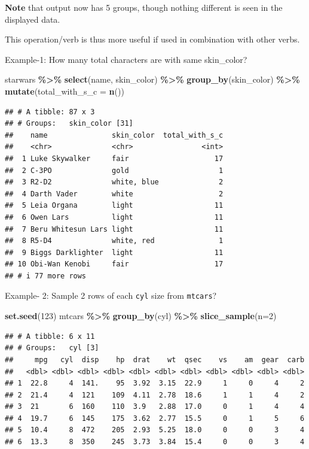 \documentclass[
]{book}
\newenvironment{Shaded}{\begin{snugshade}}{\end{snugshade}}
\newcommand{\AttributeTok}[1]{\textcolor[rgb]{0.13,0.29,0.53}{#1}}
\newcommand{\DecValTok}[1]{\textcolor[rgb]{0.00,0.00,0.81}{#1}}
\newcommand{\FunctionTok}[1]{\textcolor[rgb]{0.13,0.29,0.53}{\textbf{#1}}}
\newcommand{\NormalTok}[1]{#1}
\newcommand{\SpecialCharTok}[1]{\textcolor[rgb]{0.81,0.36,0.00}{\textbf{#1}}}
\begin{document}
\textbf{Note} that output now has 5 groups, though nothing different is seen in the displayed data.

This operation/verb is thus more useful if used in combination with other verbs.

Example-1: How many total characters are with same skin\_color?

\begin{Shaded}
\begin{Highlighting}[]
\NormalTok{starwars }\SpecialCharTok{\%\textgreater{}\%} 
  \FunctionTok{select}\NormalTok{(name, skin\_color) }\SpecialCharTok{\%\textgreater{}\%} 
  \FunctionTok{group\_by}\NormalTok{(skin\_color) }\SpecialCharTok{\%\textgreater{}\%} 
  \FunctionTok{mutate}\NormalTok{(}\AttributeTok{total\_with\_s\_c =} \FunctionTok{n}\NormalTok{())}
\end{Highlighting}
\end{Shaded}

\begin{verbatim}
## # A tibble: 87 x 3
## # Groups:   skin_color [31]
##    name               skin_color  total_with_s_c
##    <chr>              <chr>                <int>
##  1 Luke Skywalker     fair                    17
##  2 C-3PO              gold                     1
##  3 R2-D2              white, blue              2
##  4 Darth Vader        white                    2
##  5 Leia Organa        light                   11
##  6 Owen Lars          light                   11
##  7 Beru Whitesun Lars light                   11
##  8 R5-D4              white, red               1
##  9 Biggs Darklighter  light                   11
## 10 Obi-Wan Kenobi     fair                    17
## # i 77 more rows
\end{verbatim}

Example- 2: Sample 2 rows of each \texttt{cyl} size from \texttt{mtcars}?

\begin{Shaded}
\begin{Highlighting}[]
\FunctionTok{set.seed}\NormalTok{(}\DecValTok{123}\NormalTok{)}
\NormalTok{mtcars }\SpecialCharTok{\%\textgreater{}\%} 
  \FunctionTok{group\_by}\NormalTok{(cyl) }\SpecialCharTok{\%\textgreater{}\%} 
  \FunctionTok{slice\_sample}\NormalTok{(}\AttributeTok{n=}\DecValTok{2}\NormalTok{)}
\end{Highlighting}
\end{Shaded}

\begin{verbatim}
## # A tibble: 6 x 11
## # Groups:   cyl [3]
##     mpg   cyl  disp    hp  drat    wt  qsec    vs    am  gear  carb
##   <dbl> <dbl> <dbl> <dbl> <dbl> <dbl> <dbl> <dbl> <dbl> <dbl> <dbl>
## 1  22.8     4  141.    95  3.92  3.15  22.9     1     0     4     2
## 2  21.4     4  121    109  4.11  2.78  18.6     1     1     4     2
## 3  21       6  160    110  3.9   2.88  17.0     0     1     4     4
## 4  19.7     6  145    175  3.62  2.77  15.5     0     1     5     6
## 5  10.4     8  472    205  2.93  5.25  18.0     0     0     3     4
## 6  13.3     8  350    245  3.73  3.84  15.4     0     0     3     4
\end{verbatim}
\end{document}
